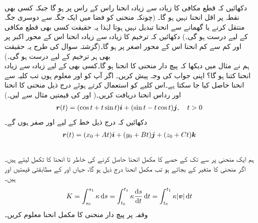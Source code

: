 \\
دکھائیں کہ قطع مکافی  کا  زیادہ سے   زیادہ   انحنا راس کے راس پر ہو گا جبکہ کسی بھی نقطہ پر اقل انحنا نہیں ہو گا۔ (چونکہ منحنی کو فضا میں ایک جگہ سے دوسری جگہ منتقل کرنے یا گھمانے سے انحنا تبدیل نہیں ہوتا لہٰذا یہ حقیقت کسی بھی قطع مکافی کے لیے درست ہو گی۔)
دکھائیں کہ ترخیم  کا  زیادہ سے زیادہ انحنا اس کے محور اکبر پر اور کم سے کم انحنا اس کے  محور اصغر  پر ہو گا۔(گزشتہ سوال کی طرح یہ حقیقت بھی ہر ترخیم کے لیے درست ہو گی۔)
\\
ہم نے مثال  میں دیکھا کہ پیچ دار منحنی    کا انحنا  ہو گا۔کسی بھی  کے لیے زیادہ سے زیادہ انحنا کتنا ہو گا؟ اپنی جواب کی وجہ پیش کریں۔ 
اگر آپ کو  اور  معلوم ہوں تب کلیہ  سے انحنا حاصل کیا جا سکتا ہے۔اس کلیے  کو استعمال کرتے ہوئے درج ذیل منحنی کا انحنا اور رداس انحنا دریافت کریں۔( اور  کی قیمتیں مثال  سے لیں۔)
\begin{align*}
{\ensuremath{{\boldsymbol{r}}}}(t)=(\cos t+t\sin t){\boldsymbol{i}}+(\sin t-t\cos t){\boldsymbol{j}},\quad t>0
\end{align*}
دکھائیں کہ درج ذیل خط کے لیے  اور  صفر ہوں گے۔
\begin{align*}
{\ensuremath{{\boldsymbol{r}}}}(t)=(x_0+At){\boldsymbol{i}}+(y_0+Bt){\boldsymbol{j}}+(z_0+Ct){\boldsymbol{k}}
\end{align*}
\\
ہم ایک منحنی پر    سے   تک کے  حصے کا  مکمل انحنا حاصل کرنے کی خاطر  تا  انحنا  کا تکمل لیتے ہیں۔ اگر منحنی کا متغیر   کے بجائے  ہو تب مکمل انحنا درج ذیل ہو گا، جہاں  اور  کے مطابقتی قیمتیں  اور  ہیں۔
\begin{align*}
K=\int_{s_0}^{s_1}\kappa\dif s=\int_{t_0}^{t_1}\kappa\frac{\dif s}{\dif t}\dif t=\int_{t_0}^{t_1}\kappa\abs{\kvec{v}}\dif t
\end{align*}
وقفہ  پر پیچ دار منحنی  کا مکمل انحنا معلوم کریں۔
